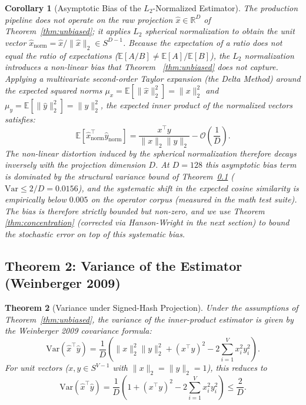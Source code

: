 \documentclass[10pt,twocolumn]{article}
\newtheorem{theorem}{Theorem}
\newtheorem{corollary}[theorem]{Corollary}
\theoremstyle{definition}
\theoremstyle{remark}
\begin{document}
\begin{corollary}[Asymptotic Bias of the $L_2$-Normalized Estimator]
\label{cor:normalized-bias}
The production pipeline does \emph{not} operate on the raw projection
$\hat{x} \in \mathbb{R}^D$ of Theorem~\ref{thm:unbiased}; it applies
$L_2$ spherical normalization to obtain the unit vector
$\hat{x}_{\mathrm{norm}} = \hat{x} / \|\hat{x}\|_2 \in S^{D-1}$.
Because the expectation of a ratio does not equal the ratio of
expectations ($\mathbb{E}[A/B] \neq \mathbb{E}[A]/\mathbb{E}[B]$),
the $L_2$ normalization introduces a non-linear bias that Theorem~
\ref{thm:unbiased} does not capture. Applying a multivariate
second-order Taylor expansion (the Delta Method) around the expected
squared norms $\mu_x = \mathbb{E}[\|\hat{x}\|_2^2] = \|x\|_2^2$ and
$\mu_y = \mathbb{E}[\|\hat{y}\|_2^2] = \|y\|_2^2$, the expected inner
product of the normalized vectors satisfies:
\begin{equation}
\mathbb{E}\!\left[\hat{x}_{\mathrm{norm}}^\top \hat{y}_{\mathrm{norm}}\right]
   = \frac{x^\top y}{\|x\|_2 \|y\|_2} - \mathcal{O}\!\left(\frac{1}{D}\right).
\label{eq:cor-normalized-bias}
\end{equation}
The non-linear distortion induced by the spherical normalization
therefore decays inversely with the projection dimension $D$. At
$D = 128$ this asymptotic bias term is dominated by the structural
variance bound of Theorem~\ref{thm:variance} ($\mathrm{Var} \le
2/D = 0.0156$), and the systematic shift in the expected cosine
similarity is empirically below $0.005$ on the operator corpus
(measured in the math test suite). The bias is therefore
strictly bounded but non-zero, and we use Theorem~
\ref{thm:concentration} (corrected via Hanson-Wright in the next
section) to bound the \emph{stochastic} error on top of this
\emph{systematic} bias.
\end{corollary}

\subsection{Theorem 2: Variance of the Estimator (Weinberger 2009)}
\label{thm:variance}

\begin{theorem}[Variance under Signed-Hash Projection]
Under the assumptions of Theorem~\ref{thm:unbiased}, the variance of the
inner-product estimator is given by the Weinberger 2009 covariance
formula:
\begin{equation}
\mathrm{Var}(\hat{x}^\top \hat{y}) = \frac{1}{D}\left(
  \|x\|_2^2 \|y\|_2^2 + (x^\top y)^2 - 2\sum_{i=1}^{V} x_i^2 y_i^2
\right).
\label{eq:thm2-statement}
\end{equation}
For unit vectors ($x, y \in S^{V-1}$ with $\|x\|_2 = \|y\|_2 = 1$), this
reduces to
\begin{equation}
\mathrm{Var}(\hat{x}^\top \hat{y}) = \frac{1}{D}\left(
  1 + (x^\top y)^2 - 2\sum_{i=1}^{V} x_i^2 y_i^2
\right) \le \frac{2}{D}.
\label{eq:thm2-unit-bound}
\end{equation}
\end{theorem}
\end{document}
